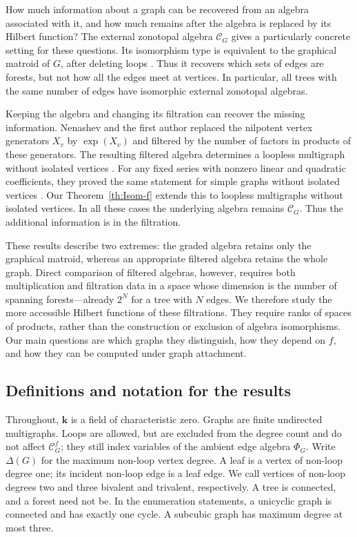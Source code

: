 \documentclass[reqno]{article}
\theoremstyle{plain} %
\theoremstyle{definition}
\theoremstyle{remark}
\newcommand{\K} {\mathbf{k}}
\newcommand {\CC}{\mathscr{C}}
\numberwithin{equation}{section}
\begin{document}
How much information about a graph can be recovered from an algebra
associated with it, and how much remains after the algebra is replaced
by its Hilbert function? The external zonotopal algebra $\CC_G$ gives a
particularly concrete setting for these questions. Its isomorphism type
is equivalent to the graphical matroid of $G$, after deleting loops
\cite{Wa1,N1,Ne}. Thus it recovers which sets of edges are forests, but
not how all the edges meet at vertices. In particular, all trees with
the same number of edges have isomorphic external zonotopal algebras.

Keeping the algebra and changing its filtration can recover the missing
information. Nenashev and the first author \cite{NSh} replaced the nilpotent vertex
generators $X_v$ by $\exp(X_v)$ and filtered by the number of factors in
products of these generators. The resulting filtered algebra determines
a loopless multigraph without isolated vertices
\cite[Theorem~5]{NSh}. For any fixed series with nonzero linear and
quadratic coefficients, they proved the same statement for simple
graphs without isolated vertices \cite[Theorem~6]{NSh}.
Our Theorem~\ref{th:Isom-f} extends this to loopless multigraphs without
isolated vertices. In all these cases the underlying algebra remains
$\CC_G$. Thus the additional information is in the filtration.

These results describe two extremes: the graded algebra retains only
the graphical matroid, whereas an appropriate filtered algebra retains
the whole graph. Direct comparison of filtered algebras, however,
requires both multiplication and filtration data in a space whose
dimension is the number of spanning forests---already $2^N$ for a tree
with $N$ edges. We therefore study the more accessible Hilbert functions
of these filtrations. They require ranks of spaces of products, rather
than the construction or exclusion of algebra isomorphisms. Our main
questions are which graphs they distinguish, how they depend on $f$,
and how they can be computed under graph attachment.

\subsection{Definitions and notation for the results}

Throughout, $\K$ is a field of characteristic zero. Graphs are finite
undirected multigraphs. Loops are allowed, but are excluded from the
degree count and do not affect $\CC_G^f$; they still index variables of
the ambient edge algebra $\Phi_G$. Write $\Delta(G)$
for the maximum non-loop vertex degree. A leaf is a vertex of non-loop degree one; its incident non-loop edge
is a leaf edge. We call vertices of non-loop degrees two and three
bivalent and trivalent, respectively. A tree is connected, and a
forest need not be. In the enumeration statements, a unicyclic graph is
connected and has exactly one cycle. A subcubic graph has maximum degree
at most three.
\end{document}
